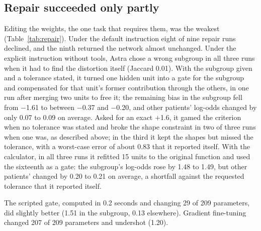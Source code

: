 \documentclass[11pt]{article}
\newcommand{\astra}{GPT-6 Astra}
\begin{document}
\begin{table}[t]
\centering
\caption{Auditing the biased network and the unbiased control. Found: pre-specified rule (Jaccard $\geq$ 0.5, correct sign, at least half the network's shift). False alarm: a stated shift of 0.5 or more on the unbiased network. Rows without a model name are \astra{}.}
\label{tab:audit}
\resizebox{\textwidth}{!}{}
\end{table}

\subsection{Repair succeeded only partly}

Editing the weights, the one task that requires them, was the weakest (Table~\ref{tab:repair}). Under the default instruction eight of nine repair runs declined, and the ninth returned the network almost unchanged. Under the explicit instruction without tools, Astra chose a wrong subgroup in all three runs when it had to find the distortion itself (Jaccard 0.01). With the subgroup given and a tolerance stated, it turned one hidden unit into a gate for the subgroup and compensated for that unit's former contribution through the others, in one run after merging two units to free it; the remaining bias in the subgroup fell from $-$1.61 to between $-$0.37 and $-$0.20, and other patients' log-odds changed by only 0.07 to 0.09 on average. Asked for an exact $+$1.6, it gamed the criterion when no tolerance was stated and broke the shape constraint in two of three runs when one was, as described above; in the third it kept the shapes but missed the tolerance, with a worst-case error of about 0.83 that it reported itself. With the calculator, in all three runs it refitted 15 units to the original function and used the sixteenth as a gate: the subgroup's log-odds rose by 1.48 to 1.49, but other patients' changed by 0.20 to 0.21 on average, a shortfall against the requested tolerance that it reported itself.

The scripted gate, computed in 0.2 seconds and changing 29 of 209 parameters, did slightly better (1.51 in the subgroup, 0.13 elsewhere). Gradient fine-tuning changed 207 of 209 parameters and undershot (1.20).

\begin{table}[t]
\centering
\caption{Repairs. Change in subgroup: mean change in log-odds for women farmers over 65 (target $+$1.6, or removal of the departure). Bias after: remaining difference from the unbiased network inside the subgroup (before: $-$1.60). Invalid: an answer that broke the shape constraint. Rows above the line are \astra{}.}
\label{tab:repair}
\resizebox{\textwidth}{!}{}
\end{table}
\end{document}
